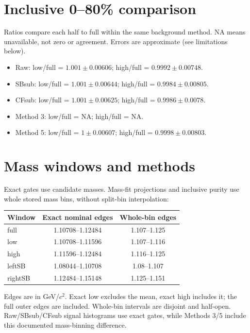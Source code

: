\documentclass[10pt,a4paper]{article}
\begin{document}
\section{Inclusive 0--80\% comparison}
Ratios compare each half to full within the same background method. NA means unavailable, not zero or agreement. Errors are approximate (see limitations below).
\begin{itemize}
\item Raw: low/full = $1.001\pm0.00606$; high/full = $0.9992\pm0.00748$.
\item SBsub: low/full = $1.001\pm0.00644$; high/full = $0.9984\pm0.00805$.
\item CFsub: low/full = $1.001\pm0.00625$; high/full = $0.9986\pm0.0078$.
\item Method 3: low/full = NA; high/full = NA.
\item Method 5: low/full = $1\pm0.00607$; high/full = $0.9998\pm0.00803$.
\end{itemize}\section{Mass windows and methods}
Exact gates use candidate masses. Mass-fit projections and inclusive purity use whole stored mass bins, without split-bin interpolation:
\begin{center}\begin{tabular}{lcc}\hline Window & Exact nominal edges & Whole-bin edges\\\hline
full & 1.10708--1.12484 & 1.107--1.125\\
low & 1.10708--1.11596 & 1.107--1.116\\
high & 1.11596--1.12484 & 1.116--1.125\\
leftSB & 1.08044--1.10708 & 1.08--1.107\\
rightSB & 1.12484--1.15148 & 1.125--1.151\\
\hline\end{tabular}\end{center}
Edges are in GeV/$c^2$. Exact low excludes the mean, exact high includes it; the full outer edges are included. Whole-bin intervals are disjoint and half-open. Raw/SBsub/CFsub signal histograms use exact gates, while Methods 3/5 include this documented mass-binning difference.
\end{document}
